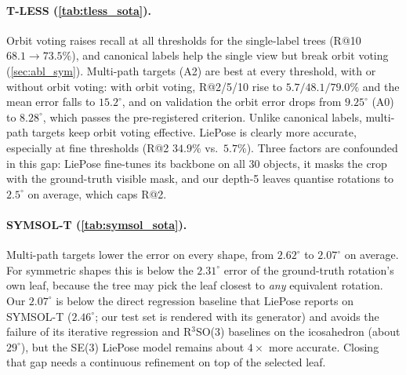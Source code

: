\begin{table}[t]
  \centering\footnotesize
  \setlength{\tabcolsep}{3.5pt}
  \resizebox{\linewidth}{!}{}
  \caption{\textbf{SYMSOL-T} test, symmetry-aware mean rotation error ($^\circ$) per shape. Ours: DINOv3 variant (selected on validation), orbit voting, 3 seeds. All published rows are from Tab.~3 of~\cite{hsiao2024liepose}, the only per-shape source we found; that table has no average column, so the averages are ours, and it reports the error as a sample-averaged ``spread'', which for a point estimate is the same formula as the symmetry-aware error.}
  \label{tab:symsol_sota}
\end{table}

\begin{table}[t]
  \centering\footnotesize
  \setlength{\tabcolsep}{2.5pt}
  \resizebox{\linewidth}{!}{}
  \caption{\textbf{YCB-V}, 6 objects, rotation error ($^\circ$) on held-out real sequences (val) and real keyframes (test), and the share of test predictions within $10^\circ$. Adding synthetic renders composited on real training backgrounds turns a failure into a working model.}
  \label{tab:ycbv}
\end{table}


\paragraph{T-LESS (\cref{tab:tless_sota}).} Orbit voting raises recall at all thresholds for the single-label trees (R@10 $68.1\to73.5\%$), and canonical labels help the single view but break orbit voting (\cref{sec:abl_sym}). Multi-path targets (A2) are best at every threshold, with or without orbit voting: with orbit voting, R@2/5/10 rise to $5.7/48.1/79.0\%$ and the mean error falls to $15.2^\circ$, and on validation the orbit error drops from $9.25^\circ$ (A0) to $8.28^\circ$, which passes the pre-registered criterion. Unlike canonical labels, multi-path targets keep orbit voting effective. LiePose is clearly more accurate, especially at fine thresholds (R@2 $34.9\%$ vs.\ $5.7\%$). Three factors are confounded in this gap: LiePose fine-tunes its backbone on all 30 objects, it masks the crop with the ground-truth visible mask, and our depth-5 leaves quantise rotations to $2.5^\circ$ on average, which caps R@2.

\paragraph{SYMSOL-T (\cref{tab:symsol_sota}).} Multi-path targets lower the error on every shape, from $2.62^\circ$ to $2.07^\circ$ on average. For symmetric shapes this is below the $2.31^\circ$ error of the ground-truth rotation's own leaf, because the tree may pick the leaf closest to \emph{any} equivalent rotation. Our $2.07^\circ$ is below the direct regression baseline that LiePose reports on SYMSOL-T ($2.46^\circ$; our test set is rendered with its generator) and avoids the failure of its iterative regression and R$^3$SO(3) baselines on the icosahedron (about $29^\circ$), but the SE(3) LiePose model remains about $4\times$ more accurate. Closing that gap needs a continuous refinement on top of the selected leaf.

